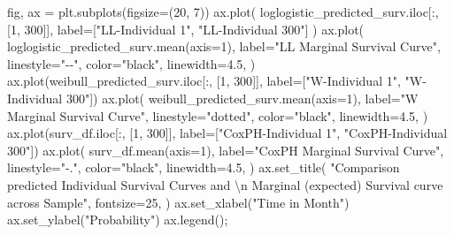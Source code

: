 \documentclass[
  letterpaper,
  DIV=11,
  numbers=noendperiod]{scrartcl}
\newenvironment{Shaded}{\begin{snugshade}}{\end{snugshade}}
\newcommand{\CharTok}[1]{\textcolor[rgb]{0.13,0.47,0.30}{#1}}
\newcommand{\DecValTok}[1]{\textcolor[rgb]{0.68,0.00,0.00}{#1}}
\newcommand{\FloatTok}[1]{\textcolor[rgb]{0.68,0.00,0.00}{#1}}
\newcommand{\NormalTok}[1]{\textcolor[rgb]{0.00,0.23,0.31}{#1}}
\newcommand{\OperatorTok}[1]{\textcolor[rgb]{0.37,0.37,0.37}{#1}}
\newcommand{\StringTok}[1]{\textcolor[rgb]{0.13,0.47,0.30}{#1}}
\begin{document}
\begin{Shaded}
\begin{Highlighting}[]
\NormalTok{fig, ax }\OperatorTok{=}\NormalTok{ plt.subplots(figsize}\OperatorTok{=}\NormalTok{(}\DecValTok{20}\NormalTok{, }\DecValTok{7}\NormalTok{))}
\NormalTok{ax.plot(}
\NormalTok{    loglogistic\_predicted\_surv.iloc[:, [}\DecValTok{1}\NormalTok{, }\DecValTok{300}\NormalTok{]], label}\OperatorTok{=}\NormalTok{[}\StringTok{"LL{-}Individual 1"}\NormalTok{, }\StringTok{"LL{-}Individual 300"}\NormalTok{]}
\NormalTok{)}
\NormalTok{ax.plot(}
\NormalTok{    loglogistic\_predicted\_surv.mean(axis}\OperatorTok{=}\DecValTok{1}\NormalTok{),}
\NormalTok{    label}\OperatorTok{=}\StringTok{"LL Marginal Survival Curve"}\NormalTok{,}
\NormalTok{    linestyle}\OperatorTok{=}\StringTok{"{-}{-}"}\NormalTok{,}
\NormalTok{    color}\OperatorTok{=}\StringTok{"black"}\NormalTok{,}
\NormalTok{    linewidth}\OperatorTok{=}\FloatTok{4.5}\NormalTok{,}
\NormalTok{)}
\NormalTok{ax.plot(weibull\_predicted\_surv.iloc[:, [}\DecValTok{1}\NormalTok{, }\DecValTok{300}\NormalTok{]], label}\OperatorTok{=}\NormalTok{[}\StringTok{"W{-}Individual 1"}\NormalTok{, }\StringTok{"W{-}Individual 300"}\NormalTok{])}
\NormalTok{ax.plot(}
\NormalTok{    weibull\_predicted\_surv.mean(axis}\OperatorTok{=}\DecValTok{1}\NormalTok{),}
\NormalTok{    label}\OperatorTok{=}\StringTok{"W Marginal Survival Curve"}\NormalTok{,}
\NormalTok{    linestyle}\OperatorTok{=}\StringTok{"dotted"}\NormalTok{,}
\NormalTok{    color}\OperatorTok{=}\StringTok{"black"}\NormalTok{,}
\NormalTok{    linewidth}\OperatorTok{=}\FloatTok{4.5}\NormalTok{,}
\NormalTok{)}
\NormalTok{ax.plot(surv\_df.iloc[:, [}\DecValTok{1}\NormalTok{, }\DecValTok{300}\NormalTok{]], label}\OperatorTok{=}\NormalTok{[}\StringTok{"CoxPH{-}Individual 1"}\NormalTok{, }\StringTok{"CoxPH{-}Individual 300"}\NormalTok{])}
\NormalTok{ax.plot(}
\NormalTok{    surv\_df.mean(axis}\OperatorTok{=}\DecValTok{1}\NormalTok{),}
\NormalTok{    label}\OperatorTok{=}\StringTok{"CoxPH Marginal Survival Curve"}\NormalTok{,}
\NormalTok{    linestyle}\OperatorTok{=}\StringTok{"{-}."}\NormalTok{,}
\NormalTok{    color}\OperatorTok{=}\StringTok{"black"}\NormalTok{,}
\NormalTok{    linewidth}\OperatorTok{=}\FloatTok{4.5}\NormalTok{,}
\NormalTok{)}
\NormalTok{ax.set\_title(}
    \StringTok{"Comparison predicted Individual Survival Curves and }\CharTok{\textbackslash{}n}\StringTok{ Marginal (expected) Survival curve across Sample"}\NormalTok{,}
\NormalTok{    fontsize}\OperatorTok{=}\DecValTok{25}\NormalTok{,}
\NormalTok{)}
\NormalTok{ax.set\_xlabel(}\StringTok{"Time in Month"}\NormalTok{)}
\NormalTok{ax.set\_ylabel(}\StringTok{"Probability"}\NormalTok{)}
\NormalTok{ax.legend()}\OperatorTok{;}
\end{Highlighting}
\end{Shaded}
\end{document}
